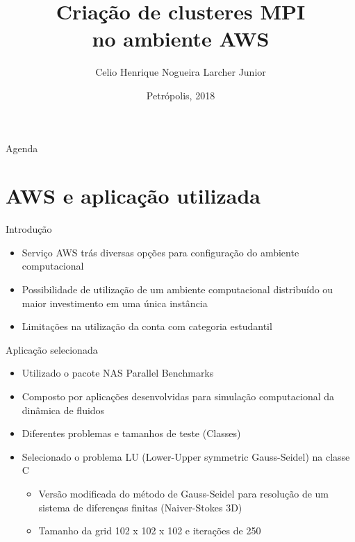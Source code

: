 \documentclass{beamer}
\title{Criação de clusteres MPI \\no ambiente AWS}
\author{Celio Henrique Nogueira Larcher Junior}
\institute[Laboratório Nacional de Computação Científica] %
{
  Laboratório Nacional de Computação Científica
  }
\date{Petrópolis, 2018}
\begin{document}
\begin{frame}
  \titlepage
\end{frame}

\begin{frame}{Agenda}
\footnotesize
  \tableofcontents
\end{frame}





\section{AWS e aplicação utilizada}

\begin{frame}{Introdução}
	\begin{itemize}
		\item Serviço AWS trás diversas opções para configuração do ambiente computacional
		\item Possibilidade de utilização de um  ambiente computacional distribuído ou maior investimento em uma única instância
		\item Limitações na utilização da conta com categoria estudantil
	\end{itemize}
\end{frame}


\begin{frame}{Aplicação selecionada}
	\begin{itemize}
		\item Utilizado o pacote NAS Parallel Benchmarks
		\item Composto por aplicações desenvolvidas para simulação computacional da dinâmica de fluidos
		\item Diferentes problemas e tamanhos de teste (Classes)
		\item Selecionado o problema LU (Lower-Upper symmetric Gauss-Seidel) na classe C
		\begin{itemize}
			\item Versão modificada do método de Gauss-Seidel para resolução de um sistema de diferenças finitas (Naiver-Stokes 3D)
			\item Tamanho da grid 102 x 102 x 102 e iterações de 250
		\end{itemize}

	\end{itemize}
\end{frame}
\end{document}
